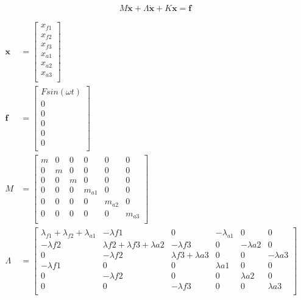 \documentclass[12pt]{article}
\begin{document}
	
\begin{equation}
M\mathbf{\ddot{x}} + \Lambda\mathbf{\dot{x}} + K\mathbf{x} = \mathbf{f}
\end{equation}
	
	
\begin{math}	
\begin{aligned}
\mathbf{x} &= 
\begin{bmatrix} 
	x_{f1} \\
	x_{f2} \\
	x_{f3} \\
	x_{a1} \\
	x_{a2} \\
	x_{a3} \\
\end{bmatrix} \\
\mathbf{f} &= 
\begin{bmatrix} 
	Fsin(\omega t) \\
	0 \\
	0 \\
	0 \\
	0 \\
	0 \\
\end{bmatrix} \\	
M &=
\begin{bmatrix} 
 m & 0 & 0 & 0 & 0 & 0 \\
 0 & m & 0 & 0 & 0 & 0 \\
 0 & 0 & m & 0 & 0 & 0 \\
 0 & 0 & 0 & m_{a1} & 0 & 0 \\
 0 & 0 & 0 & 0 & m_{a2} & 0 \\
 0 & 0 & 0 & 0 & 0 & m_{a3} \\
\end{bmatrix}  \\
\Lambda &= 
\begin{bmatrix} 
 \lambda_{f1} + \lambda_{f2} + \lambda_{a1} & -\lambda{f1} & 0 & -\lambda_{a1} & 0 & 0 \\
 -\lambda{f2} & \lambda{f2} + \lambda{f3} + \lambda{a2} & -\lambda{f3} & 0 & -\lambda{a2} & 0 \\
 0 & -\lambda{f2} & \lambda{f3} + \lambda{a3} & 0 & 0 & -\lambda{a3} \\
 -\lambda{f1} & 0 & 0 & \lambda{a1} & 0 & 0 \\
 0 & -\lambda{f2} & 0 & 0 & \lambda{a2} & 0 \\
 0 & 0 & -\lambda{f3} & 0 & 0 & \lambda{a3} \\
 \end{bmatrix} \\

\end{aligned}
\end{math}
\end{document}
